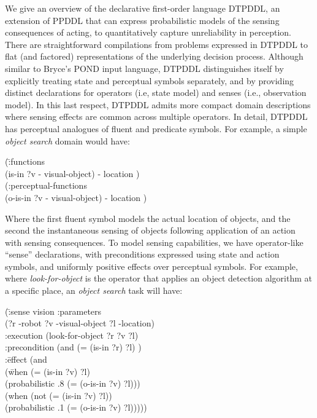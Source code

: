 


We give an overview of the declarative first-order language DTPDDL, an
extension of PPDDL that can express probabilistic models of the
sensing consequences of acting, to quantitatively capture
unreliability in perception. There are straightforward compilations
from problems expressed in DTPDDL to flat (and factored)
representations of the underlying decision process. Although similar
to Bryce's POND input language, DTPDDL distinguishes itself by
explicitly treating state and perceptual symbols separately, and by
providing distinct declarations for operators (i.e, state model) and
senses (i.e., observation model). In this last respect, DTPDDL admits
more compact domain descriptions where sensing effects are common
across multiple operators. In detail, DTPDDL has perceptual analogues of
fluent and predicate symbols. For example, a simple {\em object search}
domain would have:

\vspace{-1ex}
\small
\begin{tabtt}
(\=:functions\\
  \> (is-in ?v - visual-object) - location )\\
(:perceptual-functions\\
  \> (o-is-in ?v - visual-object) - location )
\end{tabtt}
\normalsize
\vspace{-1ex}

\noindent Where the first fluent symbol models the actual location of
objects, and the second the instantaneous sensing of objects
following application of an action with sensing consequences.
To model sensing capabilities, we have operator-like ``sense''
declarations, with preconditions expressed using state and action
symbols, and uniformly positive effects over perceptual symbols. For
example, where {\em look-for-object} is the operator that applies an
object detection algorithm at a specific place, an {\em
object search} task will have:

\vspace{-1ex}
\small
\begin{tabtt}
(\= :sense vision  :parameters \+ \\
  (?r -robot ?v -visual-object ?l -location) \\
 :execution  (look-for-object ?r ?v ?l) \\
 :precondition (and (= (is-in ?r) ?l) ) \\
 :\=effect (and \+\\
    (\= when (= (is-in ?v) ?l)\\
    \>(probabilistic .8 (= (o-is-in ?v) ?l))) \\
   (when (not (= (is-in ?v) ?l)) \\
    \>(probabilistic .1 (= (o-is-in ?v) ?l))))) \\
\end{tabtt}
\normalsize
\vspace{-3ex}

